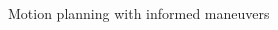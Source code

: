 \begin{columns}[t]
\begin{column}{0.50\textwidth}
\begin{block}{\large Motion planning with informed maneuvers}
\begin{columns}[T]
\begin{column}{0.98\textwidth}
\begin{itemize}
					\end{itemize}
				\end{column}
			\end{columns}
		\end{block}
	\end{column}
\end{columns}	
		    
